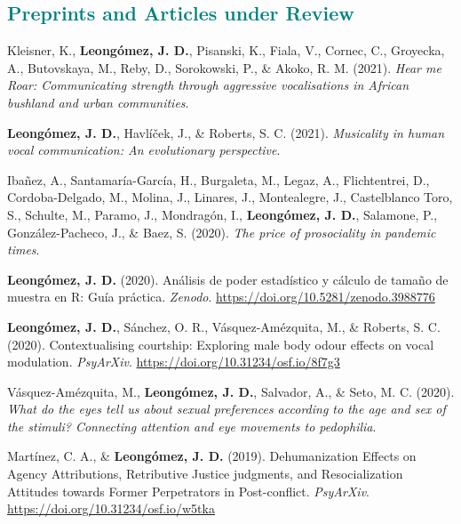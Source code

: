 \documentclass[11pt, a4paper]{awesome-cv}
\begin{document}
\hypertarget{section}{%
\subsection{\texorpdfstring{\textcolor{teal}{Preprints and Articles under Review}}{}}\label{section}}

\begingroup
\setlength{\parindent}{-0.5in}
\setlength{\leftskip}{0.5in}

\hypertarget{refs_working_paper}{}
\leavevmode\hypertarget{ref-kleisnerHearMeRoar2021}{}%
Kleisner, K., \textbf{Leongómez, J. D.}, Pisanski, K., Fiala, V.,
Cornec, C., Groyecka, A., Butovskaya, M., Reby, D., Sorokowski, P., \&
Akoko, R. M. (2021). \emph{Hear me {Roar}: {Communicating} strength
through aggressive vocalisations in {African} bushland and urban
communities}.

\leavevmode\hypertarget{ref-leongomezMusicalityHumanVocal2021}{}%
\textbf{Leongómez, J. D.}, Havlíček, J., \& Roberts, S. C. (2021).
\emph{Musicality in human vocal communication: {An} evolutionary
perspective}.

\leavevmode\hypertarget{ref-Ibanez2020}{}%
Ibañez, A., Santamaría-García, H., Burgaleta, M., Legaz, A.,
Flichtentrei, D., Cordoba-Delgado, M., Molina, J., Linares, J.,
Montealegre, J., Castelblanco Toro, S., Schulte, M., Paramo, J.,
Mondragón, I., \textbf{Leongómez, J. D.}, Salamone, P.,
González-Pacheco, J., \& Baez, S. (2020). \emph{{The price of
prosociality in pandemic times}}.

\leavevmode\hypertarget{ref-Leongomez2020a}{}%
\textbf{Leongómez, J. D.} (2020). {Análisis de poder estadístico y
cálculo de tamaño de muestra en R: Guía práctica}. \emph{Zenodo}.
\url{https://doi.org/10.5281/zenodo.3988776}

\leavevmode\hypertarget{ref-Leongomez2020}{}%
\textbf{Leongómez, J. D.}, Sánchez, O. R., Vásquez-Amézquita, M., \&
Roberts, S. C. (2020). Contextualising courtship: Exploring male body
odour effects on vocal modulation. \emph{PsyArXiv}.
\url{https://doi.org/10.31234/osf.io/8f7g3}

\leavevmode\hypertarget{ref-Vasquez2021}{}%
Vásquez-Amézquita, M., \textbf{Leongómez, J. D.}, Salvador, A., \& Seto,
M. C. (2020). \emph{{What do the eyes tell us about sexual preferences
according to the age and sex of the stimuli? Connecting attention and
eye movements to pedophilia}}.

\leavevmode\hypertarget{ref-Martinez2019}{}%
Martínez, C. A., \& \textbf{Leongómez, J. D.} (2019). Dehumanization
{Effects} on {Agency Attributions}, {Retributive Justice} judgments, and
{Resocialization Attitudes} towards {Former Perpetrators} in
{Post}-conflict. \emph{PsyArXiv}.
\url{https://doi.org/10.31234/osf.io/w5tka}
\end{document}
